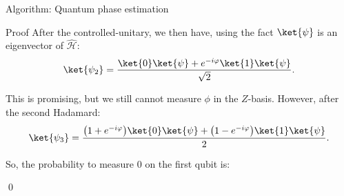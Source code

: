 \documentclass[a4paper]{article}
\begin{document}
\begin{parag}{Algorithm: Quantum phase estimation}
\begin{subparag}{Proof}
        After the controlled-unitary, we then have, using the fact $\ket{\psi}$ is an eigenvector of $\hat{\mathcal{H}}$: 
        \[\ket{\psi_2} = \frac{\ket{0}\ket{\psi} + e^{-i \phi} \ket{1} \ket{\psi}}{\sqrt{2}}.\]

        This is promising, but we still cannot measure $\phi$ in the $Z$-basis. However, after the second Hadamard: 
        \[\ket{\psi_3} = \frac{\left(1 + e^{-i\phi}\right)\ket{0}\ket{\psi} + \left(1 - e^{-i\phi}\right)\ket{1}\ket{\psi}}{2}.\]
        
        So, the probability to measure $0$ on the first qubit is: 

        \qed
    \end{subparag}
\end{parag}
\end{document}
